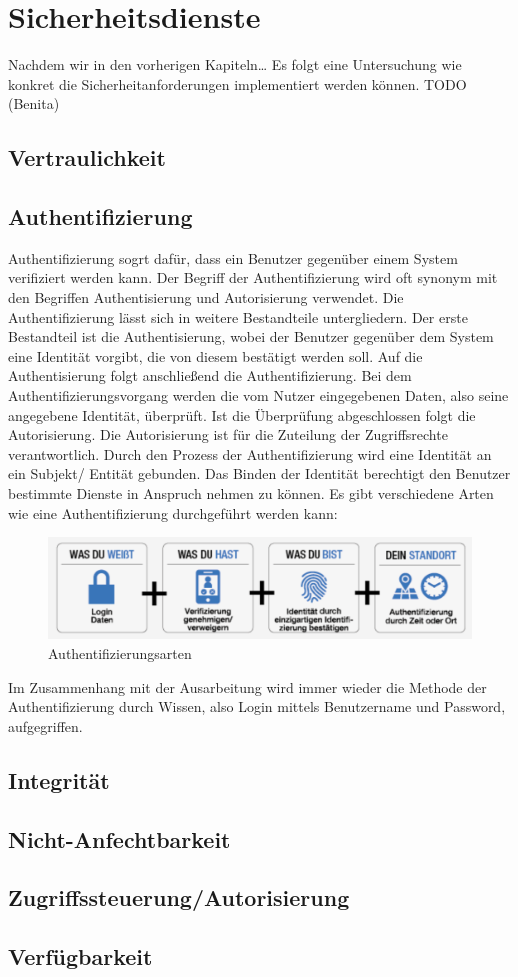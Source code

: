 \chapter{Sicherheitsdienste}\label{Sicherheitsdienste}

Nachdem wir in den vorherigen Kapiteln\dots
Es folgt eine Untersuchung wie konkret die Sicherheitanforderungen implementiert werden können.
TODO (Benita)

\section{Vertraulichkeit}
\section{Authentifizierung}

Authentifizierung sogrt dafür, dass ein Benutzer gegenüber einem System verifiziert werden kann.
Der Begriff der Authentifizierung wird oft synonym mit den Begriffen Authentisierung und Autorisierung verwendet. 
Die Authentifizierung lässt sich in weitere Bestandteile untergliedern. Der erste Bestandteil ist die Authentisierung, 
wobei der Benutzer gegenüber dem System eine Identität vorgibt, die von diesem bestätigt werden soll. 
Auf die Authentisierung folgt anschließend die Authentifizierung. Bei dem Authentifizierungsvorgang werden die vom Nutzer 
eingegebenen Daten, also seine angegebene Identität, überprüft. Ist die Überprüfung abgeschlossen folgt die 
Autorisierung. Die Autorisierung ist für die Zuteilung der Zugriffsrechte verantwortlich. 
Durch den Prozess der Authentifizierung wird eine Identität an ein Subjekt/ Entität gebunden. 
Das Binden der Identität berechtigt den Benutzer bestimmte Dienste in Anspruch nehmen zu können. 
\newline
Es gibt verschiedene Arten wie eine Authentifizierung durchgeführt werden kann:
\begin{figure}[H]
    \centering
    \includegraphics[width=\textwidth]{images/authent_pos1.png}
    \caption[Authentifizierungsarten]{Authentifizierungsarten} 
    \label{Authentifizierungsarten}
\end{figure} 
Im Zusammenhang mit der Ausarbeitung wird immer wieder die Methode der Authentifizierung durch Wissen, 
also Login mittels Benutzername und Password, aufgegriffen. 


\section{Integrität}
\section{Nicht-Anfechtbarkeit}
\section{Zugriffssteuerung/Autorisierung}
\section{Verfügbarkeit}